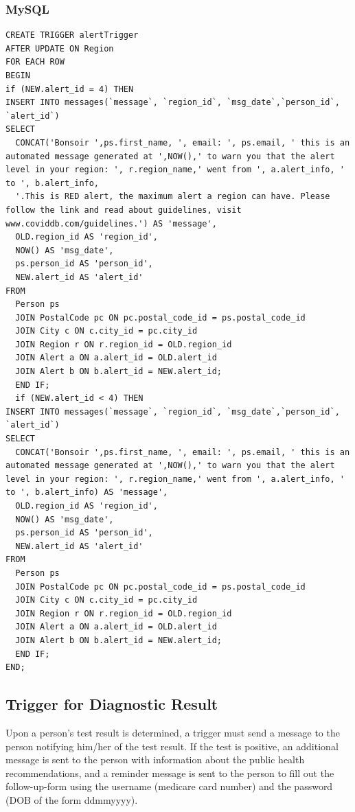 \documentclass{article}
\begin{document}
\subsubsection{MySQL}
\begin{verbatim}
CREATE TRIGGER alertTrigger
AFTER UPDATE ON Region
FOR EACH ROW
BEGIN
if (NEW.alert_id = 4) THEN
INSERT INTO messages(`message`, `region_id`, `msg_date`,`person_id`, `alert_id`)
SELECT 
  CONCAT('Bonsoir ',ps.first_name, ', email: ', ps.email, ' this is an automated message generated at ',NOW(),' to warn you that the alert level in your region: ', r.region_name,' went from ', a.alert_info, ' to ', b.alert_info, 
  '.This is RED alert, the maximum alert a region can have. Please follow the link and read about guidelines, visit www.coviddb.com/guidelines.') AS 'message',
  OLD.region_id AS 'region_id',
  NOW() AS 'msg_date',
  ps.person_id AS 'person_id',
  NEW.alert_id AS 'alert_id'
FROM 
  Person ps
  JOIN PostalCode pc ON pc.postal_code_id = ps.postal_code_id
  JOIN City c ON c.city_id = pc.city_id
  JOIN Region r ON r.region_id = OLD.region_id
  JOIN Alert a ON a.alert_id = OLD.alert_id
  JOIN Alert b ON b.alert_id = NEW.alert_id;
  END IF;
  if (NEW.alert_id < 4) THEN
INSERT INTO messages(`message`, `region_id`, `msg_date`,`person_id`, `alert_id`)
SELECT 
  CONCAT('Bonsoir ',ps.first_name, ', email: ', ps.email, ' this is an automated message generated at ',NOW(),' to warn you that the alert level in your region: ', r.region_name,' went from ', a.alert_info, ' to ', b.alert_info) AS 'message',
  OLD.region_id AS 'region_id',
  NOW() AS 'msg_date',
  ps.person_id AS 'person_id',
  NEW.alert_id AS 'alert_id'
FROM 
  Person ps
  JOIN PostalCode pc ON pc.postal_code_id = ps.postal_code_id
  JOIN City c ON c.city_id = pc.city_id
  JOIN Region r ON r.region_id = OLD.region_id
  JOIN Alert a ON a.alert_id = OLD.alert_id
  JOIN Alert b ON b.alert_id = NEW.alert_id;
  END IF;
END; 
\end{verbatim}

\subsection{Trigger for Diagnostic Result}
Upon a person’s test result is determined, a trigger must send a message to the person notifying him/her of the test result. If the test is positive, an additional message is sent to the person with information about the public health recommendations, and a reminder message is sent to the person to fill out the follow-up-form using the username (medicare card number) and the password (DOB of the form ddmmyyyy).
\end{document}

